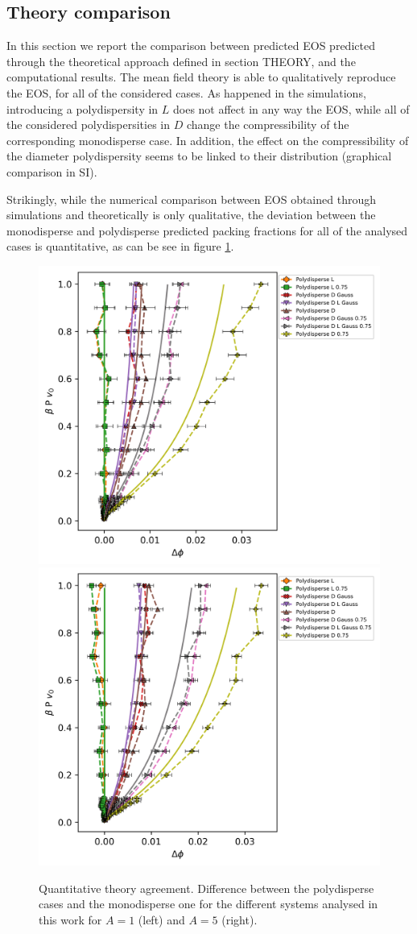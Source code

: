 \documentclass[journal=jacsat,manuscript=article]{achemso}
\begin{document}
\subsection{Theory comparison}
In this section we report the comparison between predicted EOS predicted through the theoretical approach defined in section THEORY, and the computational results. 
The mean field theory is able to qualitatively reproduce the EOS, for all of the considered cases. As happened in the simulations, introducing a polydispersity in $L$ does not affect in any way the EOS, while all of the considered polydispersities in $D$ change the compressibility of the corresponding monodisperse case. In addition, the effect on the compressibility of the diameter polydispersity seems to be linked to their distribution (graphical comparison in SI).


Strikingly, while the numerical comparison between EOS obtained through simulations and theoretically is only qualitative, the deviation between the monodisperse and polydisperse predicted packing fractions for all of the analysed cases is quantitative, as can be see in figure \ref{fig:DeltaP_P}. 

\begin{figure}[!h]
    \centering
    \includegraphics[width=0.45 \columnwidth]{Figures/Deltaphi_P_A1.png}
    \includegraphics[width=0.45 \columnwidth]{Figures/Deltaphi_P_A5.png}
    \caption{Quantitative theory agreement. Difference between the polydisperse cases and the monodisperse one for the different systems analysed in this work for $A = 1$ (left) and $A = 5$ (right).}
    \label{fig:DeltaP_P}
\end{figure}
\end{document}
